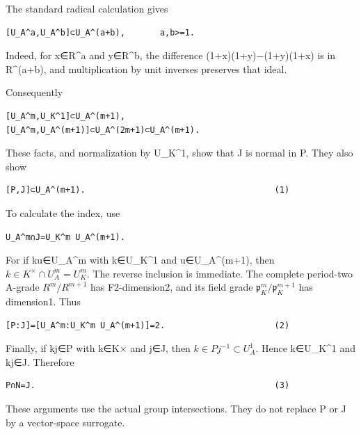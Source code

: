The standard radical calculation gives

\begin{Verbatim}[fontsize=\small,breaklines=true,breakanywhere=true]
[U_A^a,U_A^b]⊂U_A^(a+b),       a,b>=1.
\end{Verbatim}

Indeed, for x∈R\^{}a and y∈R\^{}b, the difference (1+x)(1+y)−(1+y)(1+x)
is in R\^{}(a+b), and multiplication by unit inverses preserves that
ideal.

Consequently

\begin{Verbatim}[fontsize=\small,breaklines=true,breakanywhere=true]
[U_A^m,U_K^1]⊂U_A^(m+1),
[U_A^m,U_A^(m+1)]⊂U_A^(2m+1)⊂U_A^(m+1).
\end{Verbatim}

These facts, and normalization by U\_K\^{}1, show that J is normal in P.
They also show

\begin{Verbatim}[fontsize=\small,breaklines=true,breakanywhere=true]
[P,J]⊂U_A^(m+1).                                      (1)
\end{Verbatim}

To calculate the index, use

\begin{Verbatim}[fontsize=\small,breaklines=true,breakanywhere=true]
U_A^m∩J=U_K^m U_A^(m+1).
\end{Verbatim}

For if ku∈U\_A\^{}m with k∈U\_K\^{}1 and u∈U\_A\^{}(m+1), then
\(k\in K^\times\cap U_A^m=U_K^m\). The reverse inclusion is immediate.
The complete period-two A-grade \(R^m/R^{m+1}\) has
F2-dimension2, and its field grade \(\mathfrak p_K^m/\mathfrak p_K^{m+1}\) has
dimension1. Thus

\begin{Verbatim}[fontsize=\small,breaklines=true,breakanywhere=true]
[P:J]=[U_A^m:U_K^m U_A^(m+1)]=2.                      (2)
\end{Verbatim}

Finally, if kj∈P with k∈K× and j∈J, then \(k\in Pj^{-1}\subset U_A^1\).
Hence k∈U\_K\^{}1 and kj∈J. Therefore

\begin{Verbatim}[fontsize=\small,breaklines=true,breakanywhere=true]
P∩N=J.                                                (3)
\end{Verbatim}

These arguments use the actual group intersections. They do not replace
P or J by a vector-space surrogate.

